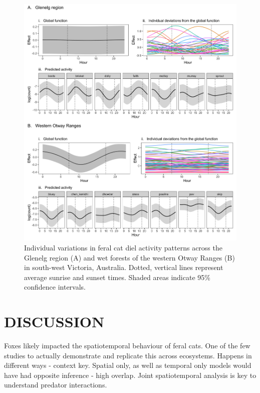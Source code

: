 \documentclass[]{elsarticle} %
\begin{document}
\newpage

\begin{figure}
\includegraphics[width=1\linewidth]{../figs/cat_ind} \caption{Individual variations in feral cat diel activity patterns across the Glenelg region (A) and wet forests of the western Otway Ranges (B) in south-west Victoria, Australia. Dotted, vertical lines represent average sunrise and sunset times. Shaded areas indicate 95\% confidence intervals.}\label{fig:ind}
\end{figure}

\newpage

\hypertarget{discussion}{%
\section{DISCUSSION}\label{discussion}}

Foxes likely impacted the spatiotemporal behaviour of feral cats. One of the few studies to actually demonstrate and replicate this across ecosystems.
Happens in different ways - context key. Spatial only, as well as temporal only models would have had opposite inference - high overlap. Joint spatiotemporal analysis is key to understand predator interactions.
\end{document}
